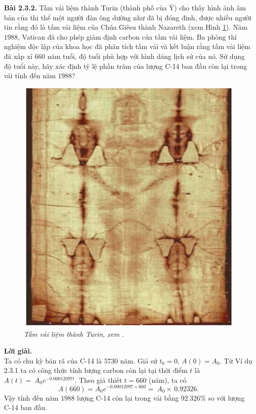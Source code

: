 \textbf{Bài 2.3.2.} Tấm vải liệm thành Turin (thành phố của Ý) cho thấy hình ảnh âm bản của thi thể một người đàn ông dường như đã bị đóng đinh, được nhiều người tin rằng đó là tấm vải liệm của Chúa Giêsu thành Nazareth (xem Hình \ref{hinh2.6}). Năm $1988$, Vatican đã cho phép giám định carbon của tấm vải liệm. Ba phòng thí nghiệm độc lập của khoa học đã phân tích tấm vải và kết luận rằng tấm vải liệm đã xấp xỉ $660$ năm tuổi, độ tuổi phù hợp với hình dáng lịch sử của nó. Sử dụng độ tuổi này, hãy xác định tỷ lệ phần trăm của lượng C-14 ban đầu còn lại trong vải tính đến năm $1988$?
\begin{figure}[H]
	\centering
	\includegraphics[scale=0.4]{Images/hinh_2_6.png}
	\caption[Tấm vải liệm thành Turin, xem \cite{ref4}.]{\itshape\fontsize{13pt}{0pt}\selectfont\centering Tấm vải liệm thành Turin, xem \cite{ref4}.}
	\label{hinh2.6}
\end{figure}
\noindent\textbf{Lời giải.}\\
Ta có chu kỳ bán rã của C-14 là $5730$ năm. Giả sử ${{t}_{0}}=0$, $A(0)={{A}_{0}}$. Từ Ví dụ 2.3.1 ta có công thức tính lượng carbon còn lại tại thời điểm $t$ là $A(t)=~{{A}_{0}}{{e}^{-0.00012097t}}$.
Theo giả thiết  $t=660$ (năm), ta có $$A(660)={{A}_{0}}{{e}^{-0.00012097\times 660}}=~{{A}_{0}}\times ~0.92326.$$
Vậy tính đến năm $1988$ lượng C-14 còn lại trong vải bằng 92.326\% so với lượng 
C-14 ban đầu.
